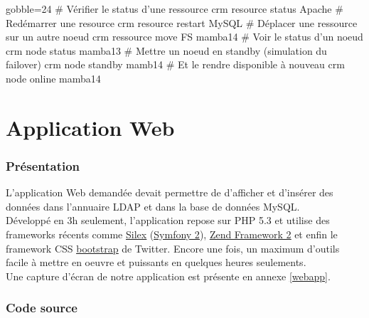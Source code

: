\documentclass[11pt,a4paper]{report}
\begin{document}
                    \begin{bashcode*}{gobble=24}
                        # Vérifier le status d'une ressource
                        crm resource status Apache
                        # Redémarrer une resource
                        crm resource restart MySQL
                        # Déplacer une ressource sur un autre noeud
                        crm ressource move FS mamba14
                        # Voir le status d'un noeud
                        crm node status mamba13
                        # Mettre un noeud en standby (simulation du failover)
                        crm node standby mamb14
                        # Et le rendre disponible à nouveau
                        crm node online mamba14
                    \end{bashcode*}
                    
    \part{Application Web}
        
        \section{Présentation}
            
            L'application Web demandée devait permettre de d'afficher et d'insérer des données dans l'annuaire LDAP et dans la base de données MySQL.\\
            
            Développé en 3h seulement, l'application repose sur PHP 5.3 et utilise des frameworks récents comme \underline{\href{http://silex.sensiolabs.org}{Silex}} (\underline{\href{http://symfony.com}{Symfony 2}}), \underline{\href{http://framework.zend.com}{Zend Framework 2}} et enfin le framework CSS \underline{\href{http://twitter.github.com/bootstrap}{bootstrap}} de Twitter. Encore une fois, un maximum d'outils facile à mettre en oeuvre et puissants en quelques heures seulements.\\
            
            Une capture d'écran de notre application est présente en annexe \no\underline{\ref{webapp}}.
            
        \section{Code source}
            
\end{document}
